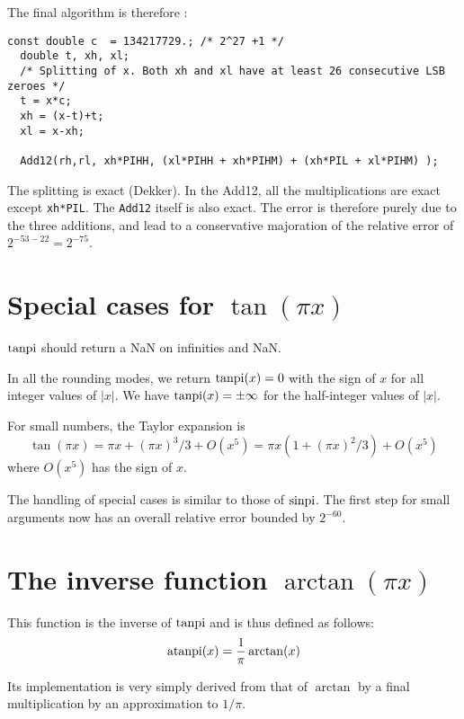 The final algorithm is therefore :
\begin{lstlisting}[caption={Multiplication by $\pi$ \label{lst:trigpi:pix}},firstnumber=1]
  const double c  = 134217729.; /* 2^27 +1 */   
  double t, xh, xl;                           
  /* Splitting of x. Both xh and xl have at least 26 consecutive LSB zeroes */
  t = x*c;     
  xh = (x-t)+t;
  xl = x-xh;   

  Add12(rh,rl, xh*PIHH, (xl*PIHH + xh*PIHM) + (xh*PIL + xl*PIHM) );               
\end{lstlisting}

The splitting is exact (Dekker). In the Add12, all the multiplications
are exact except \texttt{xh*PIL}. The \texttt{Add12} itself is also
exact. The error is therefore purely due to the three additions, and
lead to a conservative majoration of the relative error of $2^{-53-22}
= 2^{-75}$. 



\section{Special cases for $\tan(\pi x)$}
$\operatorname{tanpi}$ should return a NaN on infinities and NaN.

In all the rounding modes, we return $\operatorname{tanpi}(x)=0$ with the sign of $x$ for all
integer values of $|x|$. We have $\operatorname{tanpi}(x)=\pm \infty$ for  the half-integer
values of $|x|$. 

For small numbers, the Taylor expansion is
\begin{equation}
  \tan(\pi x) = \pi x + (\pi x)^3/3 + O(x^5) 
  = \pi x(1+(\pi x)^2/3) + O(x^5)\label{eq:tanpiTaylor}
\end{equation}
where $O(x^5)$ has the sign of $x$. 

The handling of special cases is similar to those of $\operatorname{sinpi}$. The
first step for small arguments now has an overall relative error
bounded by $2^{-60}$.
 

\section{The inverse function $\arctan(\pi x)$}

This function is the inverse of $\operatorname{tanpi}$ and is thus defined as follows:
$$\operatorname{atanpi}(x) = \frac{1}{\pi}\arctan(x)$$

Its implementation is very simply derived from that of $\arctan$ by a
final multiplication by an approximation to $1/\pi$. 

